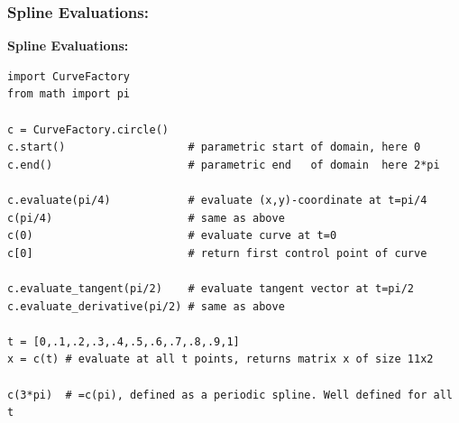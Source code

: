 \documentclass{beamer}
\theoremstyle{plain}
\theoremstyle{definition}
\begin{document}
\begin{frame}[fragile]
\frametitle{Spline Evaluations:}
\textbf{Spline Evaluations:}
\begin{listing}[H]
    \tiny
    \begin{verbatim}
import CurveFactory
from math import pi

c = CurveFactory.circle()
c.start()                   # parametric start of domain, here 0
c.end()                     # parametric end   of domain  here 2*pi

c.evaluate(pi/4)            # evaluate (x,y)-coordinate at t=pi/4
c(pi/4)                     # same as above
c(0)                        # evaluate curve at t=0
c[0]                        # return first control point of curve

c.evaluate_tangent(pi/2)    # evaluate tangent vector at t=pi/2
c.evaluate_derivative(pi/2) # same as above

t = [0,.1,.2,.3,.4,.5,.6,.7,.8,.9,1]
x = c(t) # evaluate at all t points, returns matrix x of size 11x2

c(3*pi)  # =c(pi), defined as a periodic spline. Well defined for all t
    \end{verbatim}
\end{listing}

\end{frame}

\end{document}
